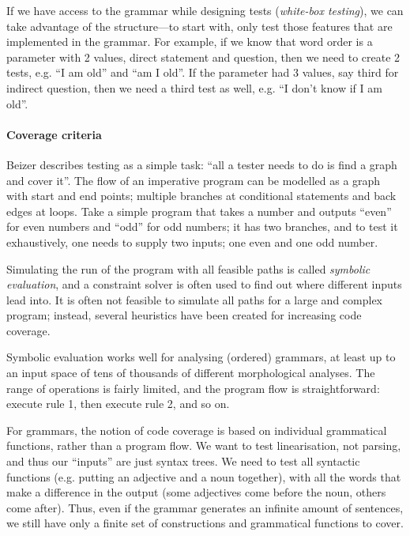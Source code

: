 If we have access to the grammar while designing tests
(\emph{white-box testing}), we can take advantage of the
structure---to start with, only test those features that are
implemented in the grammar. For example, if we know that word order is
a parameter with 2 values, direct statement and question,
then we need to create 2 tests, e.g. ``I am old'' and ``am I
old''. If the parameter had 3 values, say third for indirect question,
then we need a third test as well, e.g. ``I don't know if I am old''.



\paragraph{Coverage criteria}

Beizer \cite{beizer2003software} describes testing as a
simple task: ``all a tester needs to do is find a graph and cover
it''. The flow of an imperative program can be modelled as a graph
with start and end points; multiple branches at conditional statements
and back edges at loops. Take a simple program that takes a number and
outputs ``even'' for even numbers and ``odd'' for odd numbers; it has
two branches, and to test it exhaustively, one needs to supply two
inputs; one even and one odd number.

Simulating the run of the program with all feasible paths is called
\emph{symbolic evaluation}, and a constraint solver is often used to
find out where different inputs lead into. It is often not feasible to
simulate all paths for a large and complex program; instead, several
heuristics have been created for increasing code coverage.

Symbolic evaluation works well for analysing (ordered) \onlycg{} grammars, at
least up to an input space of tens of thousands of different
morphological analyses. The range of operations is fairly limited, and
the program flow is straightforward: execute rule 1, then execute
rule 2, and so on.

For \gf{} grammars, the notion of code coverage is based on individual
grammatical functions, rather than a program flow. We want to test
linearisation, not parsing, and thus our ``inputs'' are just syntax
trees.  We need to test all syntactic functions (e.g. putting an
adjective and a noun together), with all the words that make a
difference in the output (some adjectives come before the noun, others
come after). Thus, even if the grammar generates an infinite amount of
sentences, we still have only a finite set of constructions and
grammatical functions to cover.



